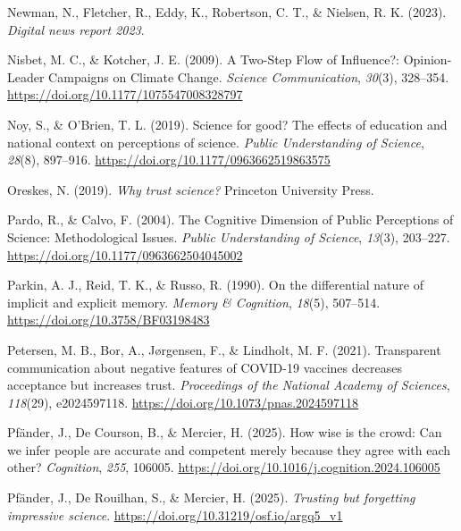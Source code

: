 \documentclass[
  jou,
  floatsintext,
  longtable,
  nolmodern,
  notxfonts,
  notimes,
  colorlinks=true,linkcolor=blue,citecolor=blue,urlcolor=blue]{apa7}
\newlength{\cslhangindent}
\newenvironment{CSLReferences}[2] %
 {\begin{list}{}{%
  \setlength{\itemindent}{0pt}
  \setlength{\leftmargin}{0pt}
  \setlength{\parsep}{0pt}
  \ifodd #1
   \setlength{\leftmargin}{\cslhangindent}
   \setlength{\itemindent}{-1\cslhangindent}
  \fi
  \setlength{\itemsep}{#2\baselineskip}}}
 {\end{list}}
\begin{document}
\begin{CSLReferences}{1}{0}
Newman, N., Fletcher, R., Eddy, K., Robertson, C. T., \& Nielsen, R. K.
(2023). \emph{Digital news report 2023}.

Nisbet, M. C., \& Kotcher, J. E. (2009). A Two-Step Flow of Influence?:
Opinion-Leader Campaigns on Climate Change. \emph{Science
Communication}, \emph{30}(3), 328--354.
\url{https://doi.org/10.1177/1075547008328797}

Noy, S., \& O'Brien, T. L. (2019). Science for good? The effects of
education and national context on perceptions of science. \emph{Public
Understanding of Science}, \emph{28}(8), 897--916.
\url{https://doi.org/10.1177/0963662519863575}

Oreskes, N. (2019). \emph{Why trust science?} Princeton University
Press.

Pardo, R., \& Calvo, F. (2004). The Cognitive Dimension of Public
Perceptions of Science: Methodological Issues. \emph{Public
Understanding of Science}, \emph{13}(3), 203--227.
\url{https://doi.org/10.1177/0963662504045002}

Parkin, A. J., Reid, T. K., \& Russo, R. (1990). On the differential
nature of implicit and explicit memory. \emph{Memory \& Cognition},
\emph{18}(5), 507--514. \url{https://doi.org/10.3758/BF03198483}

Petersen, M. B., Bor, A., Jørgensen, F., \& Lindholt, M. F. (2021).
Transparent communication about negative features of COVID-19 vaccines
decreases acceptance but increases trust. \emph{Proceedings of the
National Academy of Sciences}, \emph{118}(29), e2024597118.
\url{https://doi.org/10.1073/pnas.2024597118}

Pfänder, J., De Courson, B., \& Mercier, H. (2025). How wise is the
crowd: Can we infer people are accurate and competent merely because
they agree with each other? \emph{Cognition}, \emph{255}, 106005.
\url{https://doi.org/10.1016/j.cognition.2024.106005}

Pfänder, J., De Rouilhan, S., \& Mercier, H. (2025). \emph{Trusting but
forgetting impressive science}.
\url{https://doi.org/10.31219/osf.io/argq5_v1}


\end{CSLReferences}
\end{document}
